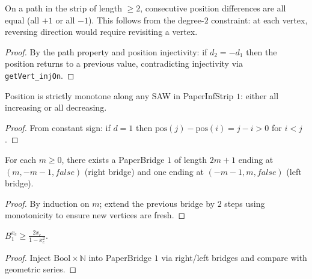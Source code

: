 \begin{lemma}
\begin{lemma}\label{lem:strip1_constant_sign}
\leanok
{}
  On a path in the strip of length $\geq 2$, consecutive position
  differences are all equal (all $+1$ or all $-1$). This follows from
  the degree-$2$ constraint: at each vertex, reversing direction would
  require revisiting a vertex.
\end{lemma}
\begin{proof}\leanok By the path property and position injectivity: if
  $d_2 = -d_1$ then the position returns to a previous value, contradicting
  injectivity via \texttt{getVert\_injOn}.\end{proof}

\begin{lemma}\label{lem:strip1_monotone}
\leanok
{}
  Position is strictly monotone along any SAW in PaperInfStrip $1$:
  either all increasing or all decreasing.
\end{lemma}
\begin{proof}\leanok From constant sign: if $d = 1$ then
  $\mathrm{pos}(j) - \mathrm{pos}(i) = j - i > 0$ for $i < j$.\end{proof}

\begin{lemma}\label{lem:bridge_existence}
\leanok
{}
  For each $m \geq 0$, there exists a PaperBridge $1$ of length
  $2m+1$ ending at $(m, -m-1, \mathit{false})$ (right bridge) and
  one ending at $(-m-1, m, \mathit{false})$ (left bridge).
\end{lemma}
\begin{proof}\leanok By induction on $m$; extend the previous bridge by
  $2$ steps using monotonicity to ensure new vertices are fresh.\end{proof}

\begin{lemma}\label{lem:bridge_partition_ge}
\leanok
{}
  $B_1^{x_c} \geq \frac{2x_c}{1 - x_c^2}$.
\end{lemma}
\begin{proof}\leanok Inject $\mathrm{Bool} \times \mathbb{N}$ into
  PaperBridge $1$ via right/left bridges and compare with geometric
  series.\end{proof}


\end{lemma}
